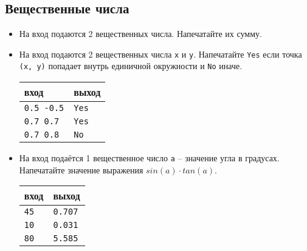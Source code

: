 \documentclass{article}
\begin{document}
\subsection*{Вещественные числа}
\begin{itemize}
\item На вход подаются 2 вещественных числа. Напечатайте их сумму.
\item На вход подаются 2 вещественных числа \texttt{x} и \texttt{y}. Напечатайте \texttt{Yes} если точка \texttt{(x, y)} попадает внутрь единичной окружности и \texttt{No} иначе.
\begin{center}
\begin{tabular}{ l | l }
 вход & выход \\ \hline
 \texttt{0.5 -0.5} & \texttt{Yes}  \\ \hline
 \texttt{0.7 0.7} & \texttt{Yes}  \\ \hline
 \texttt{0.7 0.8} & \texttt{No}  \\ 
\end{tabular}
\end{center}
\item На вход подаётся 1 вещественное число \texttt{a} -- значение угла в градусах. Напечатайте значение выражения $sin(a) \cdot tan(a)$.
\begin{center}
\begin{tabular}{ l | l }
 вход & выход \\ \hline
 \texttt{45} & \texttt{0.707}  \\ \hline
 \texttt{10} & \texttt{0.031}  \\ \hline
 \texttt{80} & \texttt{5.585}  \\ 
\end{tabular}
\end{center}
\end{itemize}
\end{document}
